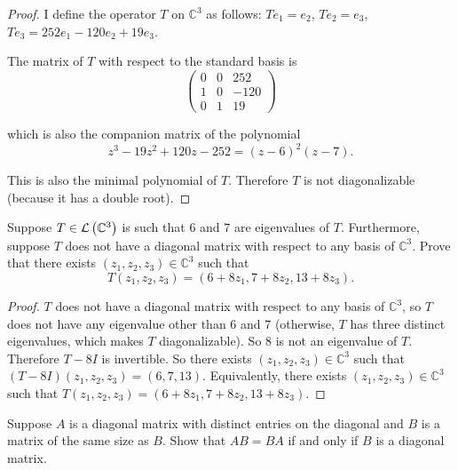 \begin{proof}
    I define the operator $T$ on $\mathbb{C}^{3}$ as follows: $Te_{1} = e_{2}$, $Te_{2} = e_{3}$, $Te_{3} = 252e_{1} - 120e_{2} + 19e_{3}$.

    The matrix of $T$ with respect to the standard basis is
    \[
        \begin{pmatrix}
            0 & 0 & 252  \\
            1 & 0 & -120 \\
            0 & 1 & 19
        \end{pmatrix}
    \]

    which is also the companion matrix of the polynomial
    \[
        z^{3} - 19z^{2} + 120z - 252 = {(z - 6)}^{2}(z - 7).
    \]

    This is also the minimal polynomial of $T$. Therefore $T$ is not diagonalizable (because it has a double root).
\end{proof}
\newpage

\begin{exercise}
    Suppose $T\in\mathcal{L}\left({\mathbb{C}^{3}}\right)$ is such that $6$ and $7$ are eigenvalues of $T$. Furthermore, suppose $T$ does not have a diagonal matrix with respect to any basis of $\mathbb{C}^{3}$. Prove that there exists $(z_{1}, z_{2}, z_{3}) \in \mathbb{C}^{3}$ such that
    \[
        T(z_{1}, z_{2}, z_{3}) = (6 + 8z_{1}, 7 + 8z_{2}, 13 + 8z_{3}).
    \]
\end{exercise}

\begin{proof}
    $T$ does not have a diagonal matrix with respect to any basis of $\mathbb{C}^{3}$, so $T$ does not have any eigenvalue other than $6$ and $7$ (otherwise, $T$ has three distinct eigenvalues, which makes $T$ diagonalizable). So $8$ is not an eigenvalue of $T$. Therefore $T - 8I$ is invertible. So there exists $(z_{1}, z_{2}, z_{3}) \in \mathbb{C}^{3}$ such that $(T - 8I)(z_{1}, z_{2}, z_{3}) = (6, 7, 13)$. Equivalently, there exists $(z_{1}, z_{2}, z_{3}) \in \mathbb{C}^{3}$ such that $T(z_{1}, z_{2}, z_{3}) = (6 + 8z_{1}, 7 + 8z_{2}, 13 + 8z_{3})$.
\end{proof}
\newpage

\begin{exercise}
    Suppose $A$ is a diagonal matrix with distinct entries on the diagonal and $B$ is a matrix of the same size as $B$. Show that $AB = BA$ if and only if $B$ is a diagonal matrix.
\end{exercise}

